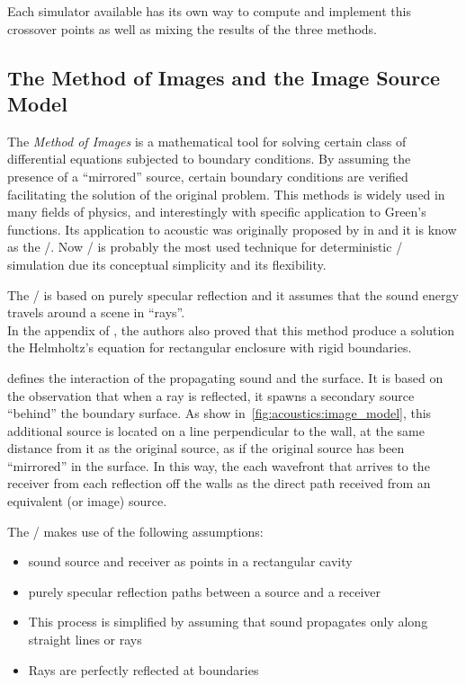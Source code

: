 Each simulator available has its own way to compute and implement this crossover points as well as mixing the results of the three methods.

\subsection{The Method of Images and the Image Source Model}\label{subsec:acoustics:ism}
The \textit{Method of Images} is a mathematical tool for solving certain class of differential equations subjected to boundary conditions.
By assuming the presence of a ``mirrored'' source, certain boundary conditions are verified facilitating the solution of the original problem.
This methods is widely used in many fields of physics, and interestingly with specific application to Green's functions.
Its application to acoustic was originally proposed by \citeauthor{allen1979image} in \cite{allen1979image} and it is know as the \ISMdef/.
Now \ISM/ is probably the most used technique for deterministic \RIR/ simulation due its conceptual simplicity and its flexibility.

The \ISM/ is based on purely specular reflection and it assumes that the sound energy travels around a scene in ``rays''.
\\In the appendix of \cite{allen1979image}, the authors also proved that this method produce a solution the Helmholtz's equation
for rectangular enclosure with rigid boundaries.

 defines the interaction of the propagating sound and the surface.
It is based on the observation that when a ray is reflected, it spawns a secondary source ``behind'' the boundary surface.
As show in~\cref{fig:acoustics:image_model}, this additional source is located on a line perpendicular to the wall, at the same distance from it as the original source, as if the original source has been “mirrored” in the surface.
In this way, the each wavefront that arrives to the receiver from each reflection off the walls as the direct path received from an equivalent (or image) source.

The \ISM/ makes use of the following assumptions:
\begin{itemize}
    \item sound source and receiver as points in a rectangular cavity
    \item purely specular reflection paths between a source and a receiver
    \item This process is simplified by assuming that sound propagates only along straight lines or rays
    \item Rays are perfectly reflected at boundaries
\end{itemize}

